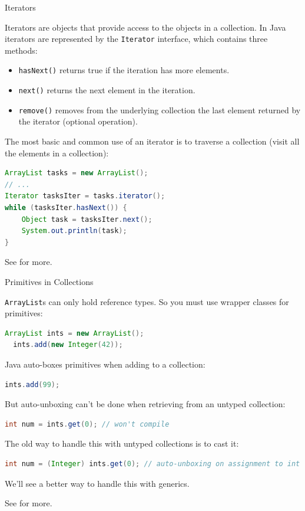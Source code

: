 \documentclass{beamer}
\begin{document}
\begin{frame}[fragile]{Iterators}


Iterators are objects that provide access to the objects in a collection.  In Java iterators are represented by the {\tt Iterator} interface, which contains three methods:
\begin{itemize}
\item {\tt hasNext()} returns true if the iteration has more elements.
\item {\tt next()} returns the next element in the iteration.
\item {\tt remove()} removes from the underlying collection the last element returned by the iterator (optional operation).
\end{itemize}

The most basic and common use of an iterator is to traverse a collection (visit all the elements in a collection):
\begin{lstlisting}[language=Java]
ArrayList tasks = new ArrayList();
// ...
Iterator tasksIter = tasks.iterator();
while (tasksIter.hasNext()) {
    Object task = tasksIter.next();
    System.out.println(task);
}
\end{lstlisting}
See  for more.

\end{frame}

\begin{frame}[fragile]{Primitives in Collections}

{\tt ArrayList}s can only hold reference types.  So you must use wrapper classes for primitives:
\begin{lstlisting}[language=Java]
  ArrayList ints = new ArrayList();
  ints.add(new Integer(42));
\end{lstlisting}
Java auto-boxes primitives when adding to a collection:
\begin{lstlisting}[language=Java]
  ints.add(99);
\end{lstlisting}
But auto-unboxing can't be done when retrieving from an untyped collection:
\begin{lstlisting}[language=Java]
  int num = ints.get(0); // won't compile
\end{lstlisting}
The old way to handle this with untyped collections is to cast it:
\begin{lstlisting}[language=Java]
int num = (Integer) ints.get(0); // auto-unboxing on assignment to int
\end{lstlisting}
We'll see a better way to handle this with generics.

See  for more.
\end{frame}
\end{document}

